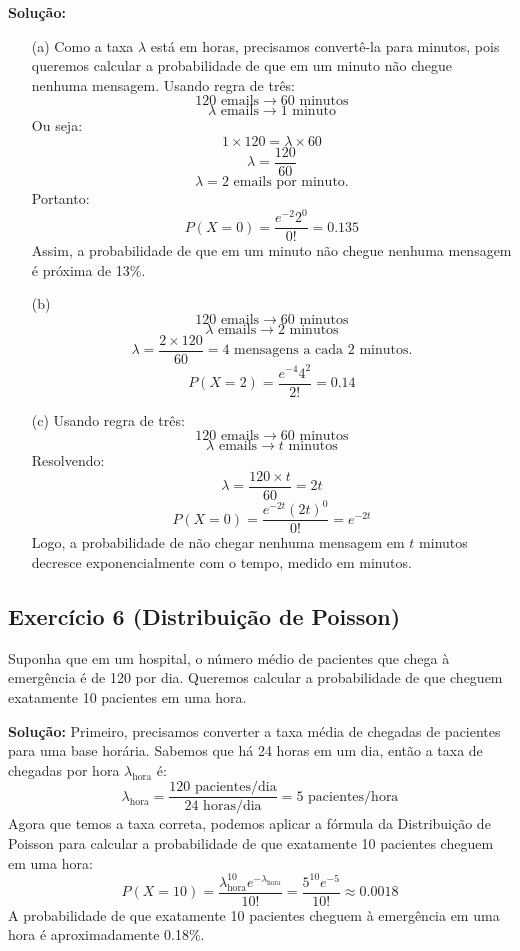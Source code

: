 \documentclass{article}
\begin{document}
\vspace{0.5cm}
\textbf{Solução:}
\begin{enumerate}
    \item[(a)] Como a taxa $\lambda$ está em horas, precisamos convertê-la para minutos, pois queremos calcular a probabilidade de que em um minuto não chegue nenhuma mensagem. Usando regra de três:
        $$
        120 \text{ emails} \rightarrow 60 \text{ minutos}
        $$
        $$
        \lambda \text{ emails} \rightarrow 1 \text{ minuto}
        $$
    Ou seja:
        $$
        1 \times 120 = \lambda \times 60
        $$
        $$
        \lambda = \frac{120}{60}
        $$
        $$
        \lambda = 2 \text{ emails por minuto.}
        $$
    Portanto:
        $$
        P(X = 0) = \frac{e^{-2} 2^0}{0!} = 0.135
        $$
    Assim, a probabilidade de que em um minuto não chegue nenhuma mensagem é próxima de 13\%.
    \item[(b)] 
        $$
        120 \text{ emails} \rightarrow 60 \text{ minutos}
        $$
        $$
        \lambda \text{ emails} \rightarrow 2 \text{ minutos}
        $$
        $$
        \lambda = \frac{2 \times 120}{60} = 4 \text{ mensagens a cada 2 minutos.}
        $$
        $$
        P(X = 2) = \frac{e^{-4} 4^2}{2!} = 0.14
        $$
    \item[(c)] Usando regra de três:
        $$
        120 \text{ emails} \rightarrow 60 \text{ minutos}
        $$
        $$
        \lambda \text{ emails} \rightarrow t \text{ minutos}
        $$
        Resolvendo:
        $$
        \lambda = \frac{120 \times t}{60} = 2t
        $$
        $$
        P(X = 0) = \frac{e^{-2t}(2t)^0}{0!} = e^{-2t}
        $$
    Logo, a probabilidade de não chegar nenhuma mensagem em $t$ minutos decresce exponencialmente com o tempo, medido em minutos.
\end{enumerate}

\subsection{Exercício 6 (Distribuição de Poisson)}
Suponha que em um hospital, o número médio de pacientes que chega à emergência é de 120 por dia. Queremos calcular a probabilidade de que cheguem exatamente 10 pacientes em uma hora.

\vspace{0.5cm}
\textbf{Solução:}
Primeiro, precisamos converter a taxa média de chegadas de pacientes para uma base horária. Sabemos que há 24 horas em um dia, então a taxa de chegadas por hora $\lambda_{\text{hora}}$ é:
    $$
    \lambda_{\text{hora}} = \frac{120 \text{ pacientes/dia}}{24 \text{ horas/dia}} = 5 \text{ pacientes/hora}
    $$
    Agora que temos a taxa correta, podemos aplicar a fórmula da Distribuição de Poisson para calcular a probabilidade de que exatamente 10 pacientes cheguem em uma hora:
    $$
    P(X = 10) = \frac{\lambda_{\text{hora}}^{10} e^{-\lambda_{\text{hora}}}}{10!} = 
    \frac{5^{10} e^{-5}}{10!} \approx 0.0018
    $$
    A probabilidade de que exatamente 10 pacientes cheguem à emergência em uma hora é aproximadamente 0.18\%.
\end{document}
